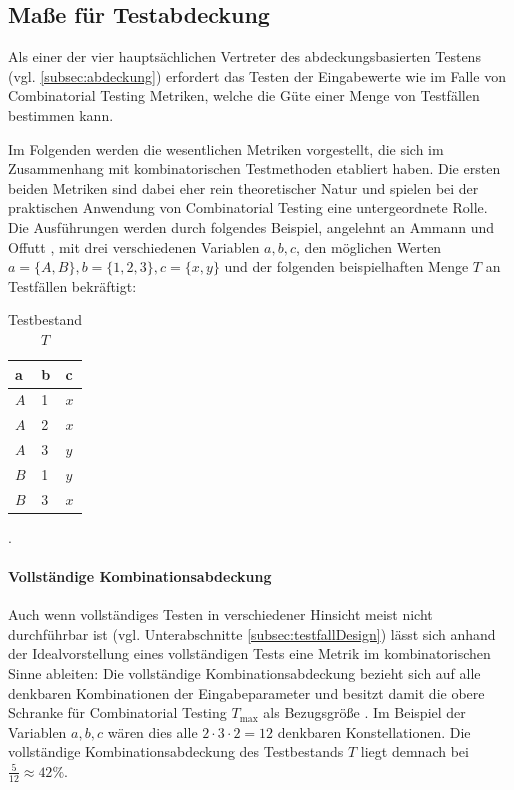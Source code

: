\subsection{Maße für Testabdeckung}\label{subsec:masse}

Als einer der vier hauptsächlichen Vertreter des abdeckungsbasierten Testens (vgl. \autoref{subsec:abdeckung}) erfordert das Testen der Eingabewerte wie im Falle von Combinatorial Testing Metriken, welche die Güte einer Menge von Testfällen bestimmen kann.

Im Folgenden werden die wesentlichen Metriken vorgestellt, die sich im Zusammenhang mit kombinatorischen Testmethoden etabliert haben. Die ersten beiden Metriken sind dabei eher rein theoretischer Natur und spielen bei der praktischen Anwendung von Combinatorial Testing eine untergeordnete Rolle. Die Ausführungen werden durch folgendes Beispiel, angelehnt an Ammann und Offutt \cite[S. 160 ff.]{ammann2008introduction}, mit drei verschiedenen Variablen $a,b,c$, den möglichen Werten $a = \{A,B\}, b = \{1,2,3\}, c = \{x,y\}$ und der folgenden beispielhaften Menge $T$ an Testfällen bekräftigt:
\begin{table}[h!]
\begin{tabular}{|l|l|l|}
\cellcolor{grauinfo}a   & \cellcolor{grauinfo}b & \cellcolor{grauinfo}c   \\ \hline
$A$ & 1 & $x$ \\ \hline
$A$ & 2 & $x$ \\ \hline
$A$ & 3 & $y$ \\ \hline
$B$ & 1 & $y$ \\ \hline
$B$ & 3 & $x$ \\ \hline
\end{tabular}
\caption{Testbestand $T$}.
\label{tab:beispielMetrik}
\end{table}
 
\paragraph{Vollständige Kombinationsabdeckung}

Auch wenn vollständiges Testen in verschiedener Hinsicht meist nicht durchführbar ist (vgl. Unterabschnitte \ref{subsec:testfallDesign}) lässt sich anhand der Idealvorstellung eines vollständigen Tests eine Metrik im kombinatorischen Sinne ableiten: Die vollständige Kombinationsabdeckung bezieht sich auf alle denkbaren Kombinationen der Eingabeparameter und besitzt damit die obere Schranke für Combinatorial Testing $T_{\max}$ als Bezugsgröße \cite[S. 160]{ammann2008introduction}. Im Beispiel der Variablen $a, b, c$ wären dies alle $2 \cdot 3 \cdot 2 = 12$ denkbaren Konstellationen. Die vollständige Kombinationsabdeckung des Testbestands $T$ liegt demnach bei $\frac{5}{12} \approx 42 \%$.

